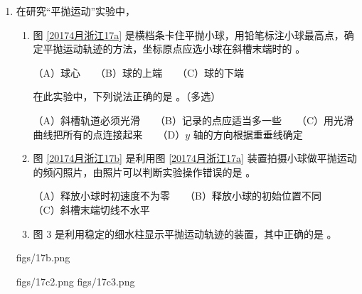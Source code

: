\documentclass[\gkver]{gaokaozhenti}
\begin{document}
\begin{enumerate}

{两只虫子运动的时间差为 $0.2\Us$}
{两只虫子运动的时间差为 $1.0\Us$}
{已知条件不够，两只虫子运动的时间差无法计算}


\item
在研究“平抛运动”实验中，

\begin{enumerate}
	\item
	图 \ref{20174月浙江17a} 是横档条卡住平抛小球，用铅笔标注小球最高点，确定平抛运动轨迹的方法，坐标原点应选小球在斜槽末端时的 。

	（A）球心　　（B）球的上端　　（C）球的下端

	在此实验中，下列说法正确的是 。（多选）

	（A）斜槽轨道必须光滑　　（B）记录的点应适当多一些　　（C）用光滑曲线把所有的点连接起来　　（D）$y$ 轴的方向根据重垂线确定
	\item
	图 \ref{20174月浙江17b} 是利用图 \ref{20174月浙江17a} 装置拍摄小球做平抛运动的频闪照片，由照片可以判断实验操作错误的是 。

	（A）释放小球时初速度不为零　　（B）释放小球的初始位置不同　　（C）斜槽末端切线不水平
	\item
	图 3 是利用稳定的细水柱显示平抛运动轨迹的装置，其中正确的是 。
\end{enumerate}

{figs/17b.png}

{figs/17c2.png}
{figs/17c3.png}

\end{enumerate}
\end{document}
